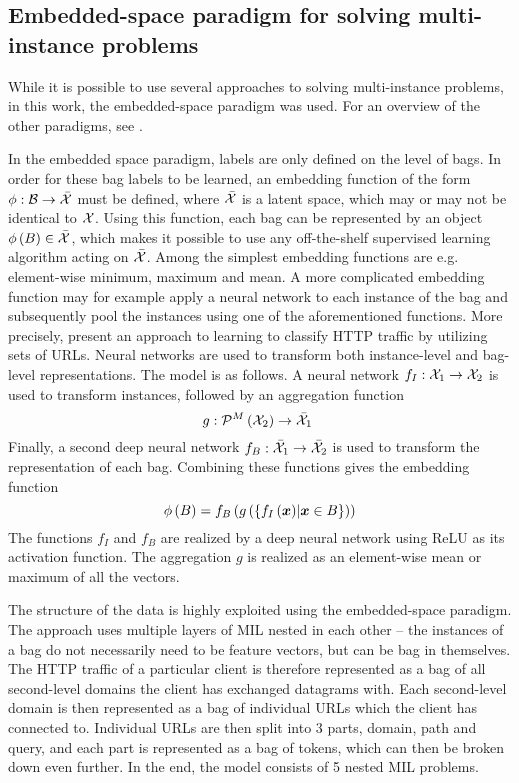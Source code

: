 \subsection{Embedded-space paradigm for solving multi-instance problems}\label{sec:embedded-space-paradigm}
While it is possible to use several approaches to solving multi-instance problems, in this work, the embedded-space paradigm was used. For an overview of the other paradigms, see \cite{dedic_optimalization_2020}.

In the embedded space paradigm, labels are only defined on the level of bags. In order for these bag labels to be learned, an embedding function of the form \( \phi : \mathcal{B} \to \bar{\mathcal{X}} \) must be defined, where \( \bar{\mathcal{X}} \) is a latent space, which may or may not be identical to \( \mathcal{X} \). Using this function, each bag can be represented by an object \( \phi \left( B \right) \in \bar{\mathcal{X}} \), which makes it possible to use any off-the-shelf supervised learning algorithm acting on \( \bar{\mathcal{X}} \). Among the simplest embedding functions are e.g. element-wise minimum, maximum and mean. A more complicated embedding function may for example apply a neural network to each instance of the bag and subsequently pool the instances using one of the aforementioned functions. More precisely, \cite{pevny_nested_2020} present an approach to learning to classify HTTP traffic by utilizing sets of URLs. Neural networks are used to transform both instance-level and bag-level representations. The model is as follows. A neural network \( f_I : \mathcal{X}_1 \to \mathcal{X}_2 \) is used to transform instances, followed by an aggregation function
\[ g: \mathcal{P}^M \left( \mathcal{X}_2 \right) \to \bar{\mathcal{X}}_1 \ \]
Finally, a second deep neural network \( f_B : \bar{\mathcal{X}}_1 \to \bar{\mathcal{X}}_2 \) is used to transform the representation of each bag. Combining these functions gives the embedding function
\[ \phi \left( B \right) = f_B \left( g \left( \left\{ f_I \left( \bm{x} \right) \middle| \bm{x} \in B \right\} \right) \right) \]
The functions \( f_I \) and \( f_B \) are realized by a deep neural network using ReLU as its activation function. The aggregation \( g \) is realized as an element-wise mean or maximum of all the vectors.

The structure of the data is highly exploited using the embedded-space paradigm. The approach uses multiple layers of MIL nested in each other -- the instances of a bag do not necessarily need to be feature vectors, but can be bag in themselves. The HTTP traffic of a particular client is therefore represented as a bag of all second-level domains the client has exchanged datagrams with. Each second-level domain is then represented as a bag of individual URLs which the client has connected to. Individual URLs are then split into 3 parts, domain, path and query, and each part is represented as a bag of tokens, which can then be broken down even further. In the end, the model consists of 5 nested MIL problems.

